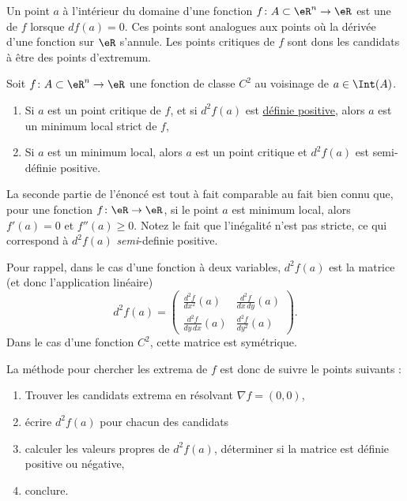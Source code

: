 Un point $a$ à l'intérieur du domaine d'une fonction $f\colon A\subset\eR^n\to \eR$ est une  de $f$ lorsque $df(a)=0$. Ces points sont analogues aux points où la dérivée d'une fonction sur $\eR$ s'annule. Les points critiques de $f$ sont dons les candidats à être des points d'extremum.

\begin{proposition}     \label{PropoExtreRn}
Soit $f\colon A\subset\eR^n\to \eR$ une fonction de classe $C^2$ au voisinage de $a\in\Int(A)$.
\begin{enumerate}

\item
Si $a$ est un point critique de $f$, et si $d^2f(a)$ est \href{http://fr.wikipedia.org/wiki/Matrice_définie_positive}{définie positive}, alors $a$ est un minimum local strict de $f$,
\item       \label{ItemPropoExtreRn}
Si $a$ est un minimum local, alors $a$ est un point critique et $d^2f(a)$ est semi-définie positive.

\end{enumerate}
\end{proposition}

La seconde partie de l'énoncé est tout à fait comparable au fait bien connu que, pour une fonction $f\colon \eR\to \eR$, si le point $a$ est minimum local, alors $f'(a)=0$ et $f''(a)\geq 0$. Notez le fait que l'inégalité n'est pas stricte, ce qui correspond à $d^2f(a)$ \emph{semi}-definie positive.

Pour rappel, dans le cas d'une fonction à deux variables, $d^2f(a)$ est la matrice (et donc l'application linéaire)
\begin{equation}
    d^2f(a)=\begin{pmatrix}
    \frac{ d^2f  }{ dx^2 }(a)   &   \frac{ d^2f  }{ dx\,dy }(a) \\ 
    \frac{ d^2f  }{ dy\,dx }(a)     &   \frac{ d^2f  }{ dy^2 }(a)
\end{pmatrix}.
\end{equation}
Dans le cas d'une fonction $C^2$, cette matrice est symétrique.

La méthode pour chercher les extrema de $f$ est donc de suivre le points suivants :
\begin{enumerate}
\item
Trouver les candidats extrema en résolvant $\nabla f=(0,0)$,
\item
écrire $d^2f(a)$ pour chacun des candidats
\item
calculer les valeurs propres de $d^2f(a)$, déterminer si la matrice est définie positive ou négative,
\item
conclure.
\end{enumerate}

